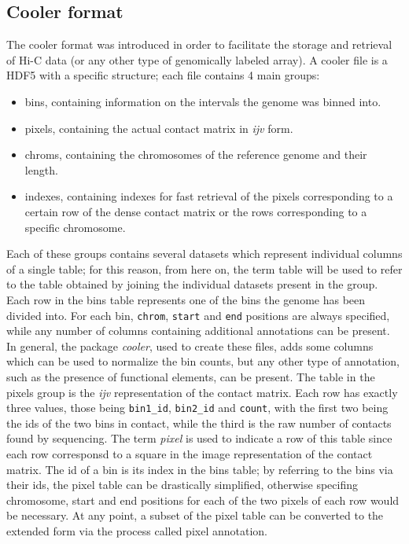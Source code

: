 \subsection{Cooler format}
The cooler format was introduced in order to facilitate the storage and retrieval of Hi-C data (or any other type of genomically labeled array)\cite{cooler2020}. A cooler file is a HDF5 with a specific structure; each file contains 4 main groups:
\begin{itemize}\tightlist
  \item bins, containing information on the intervals the genome was binned into.
  \item pixels, containing the actual contact matrix in \emph{ijv} form.
  \item chroms, containing the chromosomes of the reference genome and their length.
  \item indexes, containing indexes for fast retrieval of the pixels corresponding to a certain row of the dense contact matrix or the rows corresponding to a specific chromosome.
\end{itemize}
Each of these groups contains several datasets which represent individual columns of a single table; for this reason, from here on, the term table will be used to refer to the table obtained by joining the individual datasets present in the group.
Each row in the bins table represents one of the bins the genome has been divided into. For each bin, \texttt{chrom}, \texttt{start} and \texttt{end} positions are always specified, while any number of columns containing additional annotations can be present. In general, the package \emph{cooler}, used to create these files, adds some columns which can be used to normalize the bin counts, but any other type of annotation, such as the presence of functional elements, can be present.
The table in the pixels group is the \emph{ijv} representation of the contact matrix. Each row has exactly three values, those being \texttt{bin1\_id}, \texttt{bin2\_id} and \texttt{count}, with the first two being the ids of the two bins in contact, while the third is the raw number of contacts found by sequencing. The term \emph{pixel} is used to indicate a row of this table since each row corresponsd to a square in the image representation of the contact matrix. The id of a bin is its index in the bins table; by referring to the bins via their ids, the pixel table can be drastically simplified, otherwise specifing chromosome, start and end positions for each of the two pixels of each row would be necessary. At any point, a subset of the pixel table can be converted to the extended form via the process called pixel annotation.

